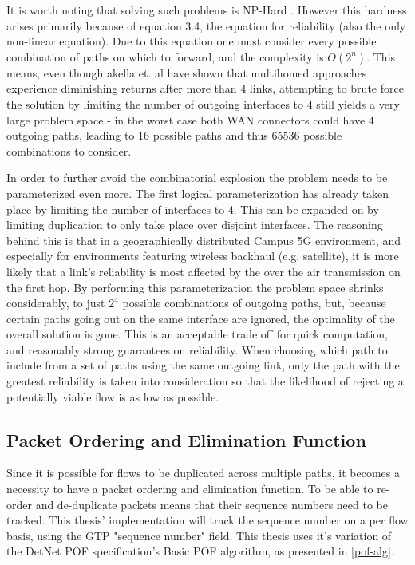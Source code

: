 It is worth noting that solving such problems is NP-Hard \cite{krentel1986complexity, }. However this hardness arises primarily because of equation 3.4, the equation for reliability (also the only non-linear equation). Due to this equation one must consider every possible combination of paths on which to forward, and the complexity is $O(2^n)$. This means, even though akella et. al \cite{akella2003measurement} have shown that multihomed approaches experience diminishing returns after more than 4 links, attempting to brute force the solution by limiting the number of outgoing interfaces to 4 still yields a very large problem space - in the worst case both WAN connectors could have 4 outgoing paths, leading to 16 possible paths and thus 65536 possible combinations to consider.

In order to further avoid the combinatorial explosion the problem needs to be parameterized even more. The first logical parameterization has already taken place by limiting the number of interfaces to 4. This can be expanded on by limiting duplication to only take place over disjoint interfaces. The reasoning behind this is that in a geographically distributed Campus 5G environment, and especially for environments featuring wireless backhaul (e.g. satellite), it is more likely that a link's reliability is most affected by the over the air transmission on the first hop. By performing this parameterization the problem space shrinks considerably, to just $2^4$ possible combinations of outgoing paths, but, because certain paths going out on the same interface are ignored, the optimality of the overall solution is gone. This is an acceptable trade off for quick computation, and reasonably strong guarantees on reliability. When choosing which path to include from a set of paths using the same outgoing link, only the path with the greatest reliability is taken into consideration so that the likelihood of rejecting a potentially viable flow is as low as possible.

\subsection{Packet Ordering and Elimination Function}

Since it is possible for flows to be duplicated across multiple paths, it becomes a necessity to have a packet ordering and elimination function. To be able to re-order and de-duplicate packets means that their sequence numbers need to be tracked. This thesis' implementation will track the sequence number on a per flow basis, using the GTP "sequence number" field. This thesis uses it's variation of the DetNet POF specification's Basic POF algorithm, as presented in \ref{pof-alg}.

